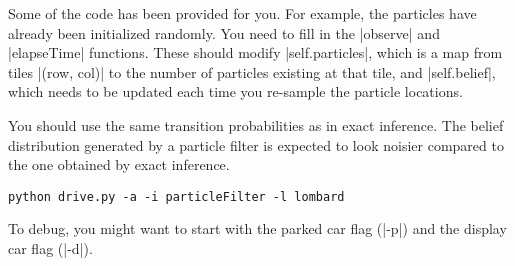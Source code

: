 \item {}
Some of the code has been provided for you. For example, the particles have
already been initialized randomly. You need to fill in the |observe| and
|elapseTime| functions. These should modify |self.particles|, which is a map
from tiles |(row, col)| to the number of particles existing at that tile, and
|self.belief|, which needs to be updated each time you re-sample the particle locations.

You should use the same transition probabilities as in exact inference. The
belief distribution generated by a particle filter is expected to look noisier
compared to the one obtained by exact inference.
\begin{lstlisting}
python drive.py -a -i particleFilter -l lombard
\end{lstlisting}

To debug, you might want to start with the parked car flag (|-p|) and the
display car flag (|-d|).
